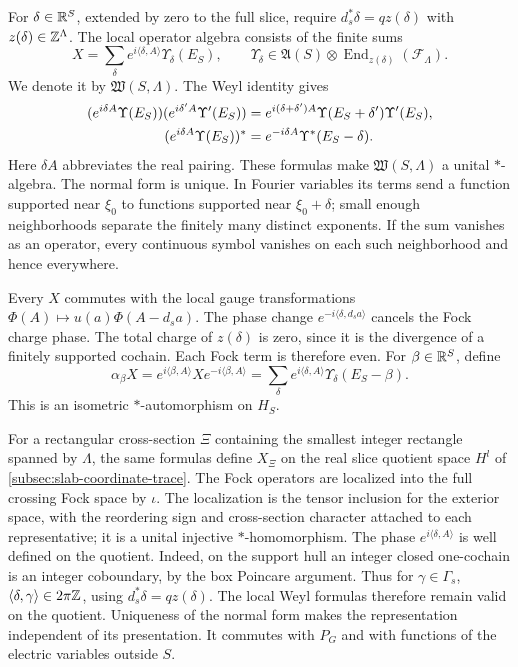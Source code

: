 For $\delta\in\mathbb R^S$, extended by zero to the full slice, require
$d_s^*\delta=qz(\delta)$ with $z(\delta)\in\mathbb Z^\Lambda$. The local
operator algebra consists of the finite sums
\begin{equation}\label{eq:diag-operator-normal-form}
 X=\sum_\delta e^{i\langle\delta,A\rangle}\Upsilon_\delta(E_S),
 \qquad\Upsilon_\delta\in\mathfrak A(S)\otimes
                      \operatorname{End}_{z(\delta)}(\mathcal F_\Lambda).
\end{equation}
We denote it by $\mathfrak W(S,\Lambda)$. The Weyl identity gives
\begin{align}\label{eq:diag-operator-rules}
 (e^{i\delta A}\Upsilon(E_S))(e^{i\delta'A}\Upsilon'(E_S))
       &=e^{i(\delta+\delta')A}\Upsilon(E_S+\delta')\Upsilon'(E_S),
          \notag\\
 (e^{i\delta A}\Upsilon(E_S))^*
       &=e^{-i\delta A}\Upsilon^*(E_S-\delta).
\end{align}
Here $\delta A$ abbreviates the real pairing. These formulas make
$\mathfrak W(S,\Lambda)$ a unital $*$-algebra. The normal form is
unique. In Fourier variables its terms send a function supported
near $\xi_0$ to functions supported near $\xi_0+\delta$; small
enough neighborhoods separate the finitely many distinct exponents.
If the sum vanishes as an operator, every continuous symbol vanishes
on each such neighborhood and hence everywhere.

Every $X$ commutes with the local gauge transformations
$\Phi(A)\mapsto u(a)\Phi(A-d_sa)$. The phase change
$e^{-i\langle\delta,d_sa\rangle}$ cancels the Fock charge phase.
The total charge of $z(\delta)$ is zero, since it is the divergence
of a finitely supported cochain. Each Fock term is therefore even.
For $\beta\in\mathbb R^S$, define
\begin{equation}\label{eq:diag-alpha}
 \alpha_\beta X=e^{i\langle\beta,A\rangle}Xe^{-i\langle\beta,A\rangle}
    =\sum_\delta e^{i\langle\delta,A\rangle}
                                      \Upsilon_\delta(E_S-\beta).
\end{equation}
This is an isometric $*$-automorphism on $H_S$.

For a rectangular cross-section $\Xi$ containing the smallest integer
rectangle spanned by $\Lambda$,
the same formulas define $X_\Xi$ on the real slice quotient space
$H^l$ of \cref{subsec:slab-coordinate-trace}. The Fock operators
are localized into the full crossing Fock space by $\iota$.
The localization is the tensor inclusion for the exterior space, with the reordering
sign and cross-section character attached to each representative;
it is a unital injective $*$-homomorphism. The phase
$e^{i\langle\delta,A\rangle}$ is well defined on the quotient.
Indeed, on the support hull an integer closed one-cochain is an
integer coboundary, by the box Poincare argument. Thus for
$\gamma\in\Gamma_s$,
$\langle\delta,\gamma\rangle\in2\pi\mathbb Z$, using
$d_s^*\delta=qz(\delta)$. The local Weyl formulas therefore remain
valid on the quotient. Uniqueness of the normal form makes the
representation independent of its presentation. It commutes with
$P_G$ and with functions of the electric variables outside $S$.

